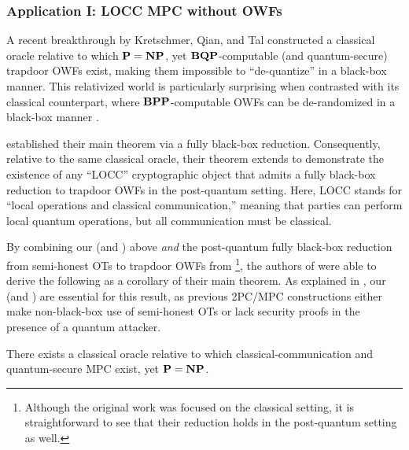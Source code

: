 \subsubsection{Application I: LOCC MPC without OWFs}

A recent breakthrough by Kretschmer, Qian, and Tal \cite{STOC:KreQiaTal25} constructed a classical oracle relative to which $\mathbf{P} = \mathbf{NP}$, yet $\mathbf{BQP}$-computable (and quantum-secure) trapdoor OWFs exist, making them impossible to ``de-quantize'' in a black-box manner. This relativized world is particularly surprising when contrasted with its classical counterpart, where $\mathbf{BPP}$-computable OWFs can be de-randomized in a black-box manner \cite{FOCS:ImpLub89}. 

\cite{STOC:KreQiaTal25} established their main theorem via a fully black-box reduction. Consequently, relative to the same classical oracle, their theorem extends to demonstrate the existence of any ``LOCC'' cryptographic object that admits a fully black-box reduction to trapdoor OWFs in the post-quantum setting.  Here, LOCC stands for ``local operations and classical communication,'' meaning that parties can perform local quantum operations, but all communication must be classical.

 By combining our  (and ) above {\em and} the post-quantum fully black-box reduction from semi-honest OTs to trapdoor OWFs from \cite{FOCS:GKMRV00}\footnote{Although the original work \cite{FOCS:GKMRV00} was focused on the classical setting, it is straightforward to see that their reduction holds in the post-quantum setting as well.}, the authors of \cite{STOC:KreQiaTal25} were able to derive the following  as a corollary of their main theorem. As explained in \cite{STOC:KreQiaTal25}, our  (and ) are essential for this result, as previous 2PC/MPC constructions either make non-black-box use of semi-honest OTs or lack security proofs in the presence of a quantum attacker.

 \begin{corollary}
 \label{cor:application-I}
There exists a classical oracle relative to which classical-communication and quantum-secure MPC exist, yet $\mathbf{P} = \mathbf{NP}$. 
 \end{corollary}



